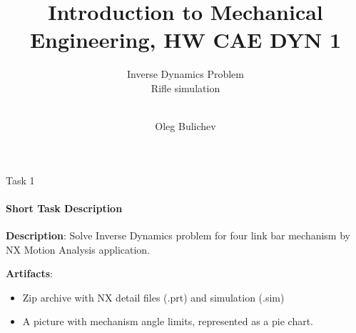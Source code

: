 \documentclass[aspectratio=169]{beamer}
\title[IME]{Introduction to Mechanical Engineering, HW CAE DYN 1} %
\subtitle{Inverse Dynamics Problem
\\ Rifle simulation  \\ \ 
         } %
\author{Oleg Bulichev}
\newcommand{\fbckg}[1]{\usebackgroundtemplate{\texttt{[image: \#1]}}}%
\begin{document}
\setlength{\abovedisplayskip}{0pt}
\setlength{\belowdisplayskip}{0pt}
\setlength{\abovedisplayshortskip}{0pt}
\setlength{\belowdisplayshortskip}{0pt}

\fbckg{fibeamer/figs/title_page.png}

\fbckg{fibeamer/figs/common.png}

\note{\scriptsize \begin{itemize}
        \item \
    \end{itemize}}

\note{
    \
}

\begin{frame}[t]{Task 1}
    \framesubtitle{Short Task Description}
    \textbf{Description}: Solve Inverse Dynamics problem for four link bar mechanism by NX Motion Analysis application.

    \textbf{Artifacts}:
    \begin{itemize}
        \item Zip archive with NX detail files (.prt) and simulation (.sim)
        \item A picture with mechanism angle limits, represented as a pie chart.
    \end{itemize}
\end{frame}
\end{document}
